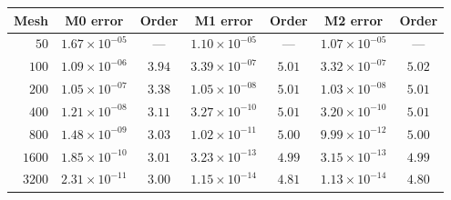 \begin{tabular}{|r||c|c||c|c||c|c|}
\hline
\bf{Mesh} & \bf{M0 error} & \bf{Order} & \bf{M1 error} & \bf{Order} & \bf{M2 error} & \bf{Order}\\
\hline
\hline
$  50$ & $1.67\times 10^{-05}$ & --- & $1.10\times 10^{-05}$ & --- & $1.07\times 10^{-05}$ & ---\\
\hline
$ 100$ & $1.09\times 10^{-06}$ & $3.94$ & $3.39\times 10^{-07}$ & $5.01$ & $3.32\times 10^{-07}$ & $5.02$\\
\hline
$ 200$ & $1.05\times 10^{-07}$ & $3.38$ & $1.05\times 10^{-08}$ & $5.01$ & $1.03\times 10^{-08}$ & $5.01$\\
\hline
$ 400$ & $1.21\times 10^{-08}$ & $3.11$ & $3.27\times 10^{-10}$ & $5.01$ & $3.20\times 10^{-10}$ & $5.01$\\
\hline
$ 800$ & $1.48\times 10^{-09}$ & $3.03$ & $1.02\times 10^{-11}$ & $5.00$ & $9.99\times 10^{-12}$ & $5.00$\\
\hline
$1600$ & $1.85\times 10^{-10}$ & $3.01$ & $3.23\times 10^{-13}$ & $4.99$ & $3.15\times 10^{-13}$ & $4.99$\\
\hline
$3200$ & $2.31\times 10^{-11}$ & $3.00$ & $1.15\times 10^{-14}$ & $4.81$ & $1.13\times 10^{-14}$ & $4.80$\\
\hline
\end{tabular}
